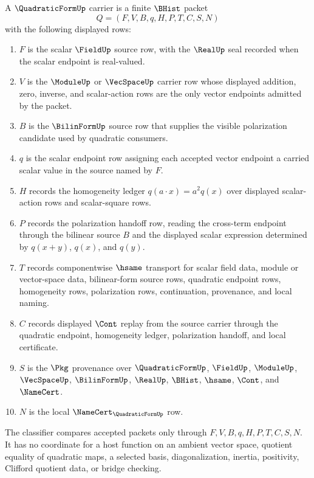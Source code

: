 \begin{definition}
\label{def:quadratic-form-carrier}
A $\QuadraticFormUp$ carrier is a finite $\BHist$ packet
$$
Q=(F,V,B,q,H,P,T,C,S,N)
$$
with the following displayed rows:
\begin{enumerate}
\item $F$ is the scalar $\FieldUp$ source row, with the $\RealUp$ seal recorded when the scalar endpoint is real-valued.
\item $V$ is the $\ModuleUp$ or $\VecSpaceUp$ carrier row whose displayed addition, zero, inverse, and scalar-action rows are the only vector endpoints admitted by the packet.
\item $B$ is the $\BilinFormUp$ source row that supplies the visible polarization candidate used by quadratic consumers.
\item $q$ is the scalar endpoint row assigning each accepted vector endpoint a carried scalar value in the source named by $F$.
\item $H$ records the homogeneity ledger $q(a\cdot x)=a^{2}q(x)$ over displayed scalar-action rows and scalar-square rows.
\item $P$ records the polarization handoff row, reading the cross-term endpoint through the bilinear source $B$ and the displayed scalar expression determined by $q(x+y)$, $q(x)$, and $q(y)$.
\item $T$ records componentwise $\hsame$ transport for scalar field data, module or vector-space data, bilinear-form source rows, quadratic endpoint rows, homogeneity rows, polarization rows, continuation, provenance, and local naming.
\item $C$ records displayed $\Cont$ replay from the source carrier through the quadratic endpoint, homogeneity ledger, polarization handoff, and local certificate.
\item $S$ is the $\Pkg$ provenance over $\QuadraticFormUp$, $\FieldUp$, $\ModuleUp$, $\VecSpaceUp$, $\BilinFormUp$, $\RealUp$, $\BHist$, $\hsame$, $\Cont$, and $\NameCert$.
\item $N$ is the local $\NameCert_{\QuadraticFormUp}$ row.
\end{enumerate}
The classifier compares accepted packets only through $F,V,B,q,H,P,T,C,S,N$. It has no coordinate for a host function on an ambient vector space, quotient equality of quadratic maps, a selected basis, diagonalization, inertia, positivity, Clifford quotient data, or bridge checking.
\end{definition}

